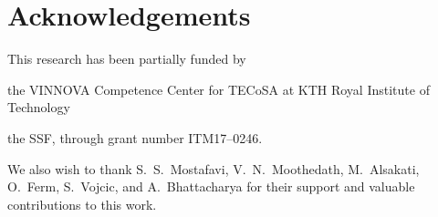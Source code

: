 \section*{Acknowledgements}\label{sec:acks}

This research has been partially funded by
\begin{enumerate*}[itemjoin={{; }}, itemjoin*={{; and }}]
    \item the VINNOVA Competence Center for \ac{TECoSA} at KTH Royal Institute of Technology
    \item the \ac{SSF}, through grant number ITM17--0246.
\end{enumerate*}

We also wish to thank S.~S.~Mostafavi, V.~N.~Moothedath, M.~Alsakati, O.~Ferm, S.~Vojcic, and A.~Bhattacharya for their support and valuable contributions to this work.

